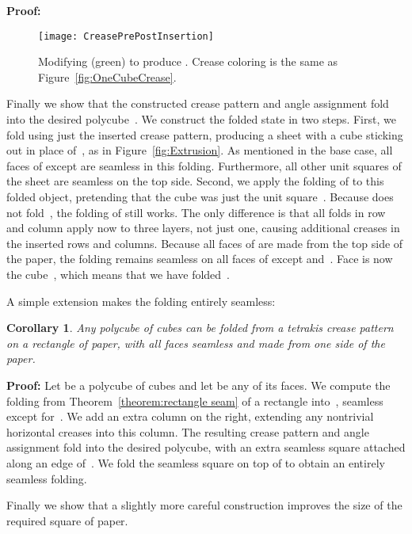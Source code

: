 \documentclass[11pt]{article}
\newtheorem{corollary}[theorem]{Corollary}
\newcommand{\figlab}[1]{\label{fig:#1}}
\newcommand{\figref}[1]{\ref{fig:#1}}
\newcommand{\theolab}[1]{\label{theorem:#1}}
\newcommand{\theoref}[1]{\ref{theorem:#1}}
\newenvironment{proof}{\noindent\textbf{Proof: }\ignorespaces}
  {\hspace*{\fill}\medskip}
\begin{document}
\begin{proof}
\begin{figure}[htbp]
\centering
\texttt{[image: CreasePrePostInsertion]}
\caption{Modifying  (green) to produce .
  Crease coloring is the same as Figure~\protect\figref{OneCubeCrease}.}
\figlab{InsertionStep}
\end{figure}


  Finally we show that the constructed crease pattern  and
  angle assignment  fold into the desired polycube~.
  We construct the folded state in two steps.
  First, we fold using just the inserted crease pattern,
  producing a sheet with a cube  sticking out in place of~,
  as in Figure~\figref{Extrusion}.
  As mentioned in the base case, all faces of  except 
  are seamless in this folding.
  Furthermore, all other unit squares of the sheet
  are seamless on the top side.
  Second, we apply the folding of  to this folded object,
  pretending that the cube  was just the unit square~.
  Because  does not fold~, the folding of  still works.
  The only difference is that all folds in row  and column 
  apply now to three layers, not just one, causing additional creases
  in the inserted rows and columns.
  Because all faces of  are made from the top side of the paper,
  the folding remains seamless on all faces of  except  and~.
  Face  is now the cube~, which means that we have folded~.
\end{proof}

A simple extension makes the folding entirely seamless:

\begin{corollary} \theolab{rectangle seamless}
  Any polycube of  cubes can be folded from a tetrakis crease pattern
  on a  rectangle of paper,
  with all faces seamless and made from one side of the paper.
\end{corollary}

\begin{proof}
  Let  be a polycube of  cubes and let  be any of its faces.
  We compute the folding from Theorem~\theoref{rectangle seam}
  of a  rectangle into~,
  seamless except for~.
  We add an extra column on the right,
  extending any nontrivial horizontal creases into this column.
  The resulting crease pattern and angle assignment fold into
  the desired polycube, with an extra seamless square
  attached along an edge of~.
  We fold the seamless square on top of 
  to obtain an entirely seamless folding.
\end{proof}

Finally we show that a slightly more careful construction improves the
size of the required square of paper.
\end{document}
